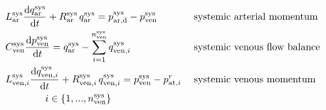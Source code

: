 \documentclass[a4paper,12pt]{report}
\begin{document}
\begin{alignat}{2}
&L_{\mathrm{ar}}^{\mathrm{sys}} \frac{\mathrm{d}q_{\mathrm{ar}}^{\mathrm{sys}}}{\mathrm{d}t} + R_{\mathrm{ar}}^{\mathrm{sys}}\,q_{\mathrm{ar}}^{\mathrm{sys}}=p_{\mathrm{ar,d}}^{\mathrm{sys}}-p_{\mathrm{ven}}^{\mathrm{sys}} && \text{\;systemic arterial momentum}\nonumber\\
&C_{\mathrm{ven}}^{\mathrm{sys}} \frac{\mathrm{d}p_{\mathrm{ven}}^{\mathrm{sys}}}{\mathrm{d}t} = q_{\mathrm{ar}}^{\mathrm{sys}}-\sum\limits_{i=1}^{n_{\mathrm{ven}}^{\mathrm{sys}}}q_{\mathrm{ven},i}^{\mathrm{sys}}\ && \text{\;systemic venous flow balance}\nonumber\\
&L_{\mathrm{ven},i}^{\mathrm{sys}} \frac{\mathrm{d}q_{\mathrm{ven},i}^{\mathrm{sys}}}{\mathrm{d}t} + R_{\mathrm{ven},i}^{\mathrm{sys}}\, q_{\mathrm{ven},i}^{\mathrm{sys}} = p_{\mathrm{ven}}^{\mathrm{sys}} - p_{\mathrm{at},i}^{r} && \text{\;systemic venous momentum}\nonumber\\
&\qquad\qquad i \in \{1,...,n_{\mathrm{ven}}^{\mathrm{sys}}\} && \nonumber
\end{alignat}
\end{document}
